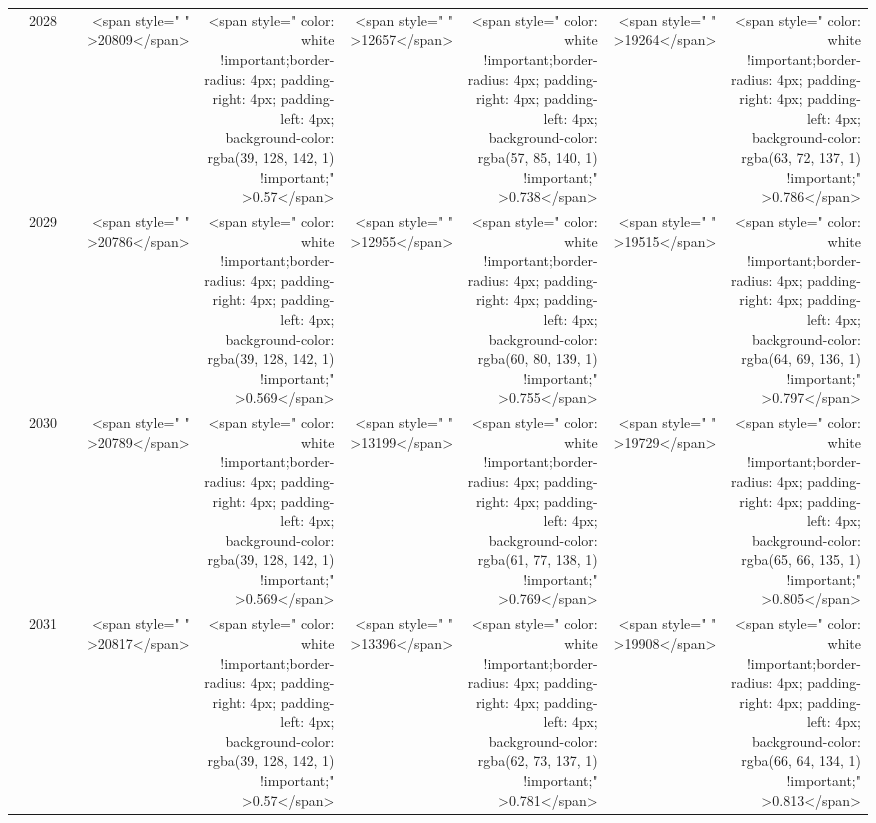 \begin{table}
\begin{tabular}[t]{>{}l|l>{}rr>{}r|rrrr}
 & 2028 & \cellcolor[HTML]{B0A473}{\textcolor{white}{1200}} & <span style="     " >20809</span> & <span style="     color: white !important;border-radius: 4px; padding-right: 4px; padding-left: 4px; background-color: rgba(39, 128, 142, 1) !important;" >0.57</span> & <span style="     " >12657</span> & <span style="     color: white !important;border-radius: 4px; padding-right: 4px; padding-left: 4px; background-color: rgba(57, 85, 140, 1) !important;" >0.738</span> & <span style="     " >19264</span> & <span style="     color: white !important;border-radius: 4px; padding-right: 4px; padding-left: 4px; background-color: rgba(63, 72, 137, 1) !important;" >0.786</span>\\

 & 2029 & \cellcolor[HTML]{B0A473}{\textcolor{white}{1200}} & <span style="     " >20786</span> & <span style="     color: white !important;border-radius: 4px; padding-right: 4px; padding-left: 4px; background-color: rgba(39, 128, 142, 1) !important;" >0.569</span> & <span style="     " >12955</span> & <span style="     color: white !important;border-radius: 4px; padding-right: 4px; padding-left: 4px; background-color: rgba(60, 80, 139, 1) !important;" >0.755</span> & <span style="     " >19515</span> & <span style="     color: white !important;border-radius: 4px; padding-right: 4px; padding-left: 4px; background-color: rgba(64, 69, 136, 1) !important;" >0.797</span>\\

 & 2030 & \cellcolor[HTML]{B0A473}{\textcolor{white}{1200}} & <span style="     " >20789</span> & <span style="     color: white !important;border-radius: 4px; padding-right: 4px; padding-left: 4px; background-color: rgba(39, 128, 142, 1) !important;" >0.569</span> & <span style="     " >13199</span> & <span style="     color: white !important;border-radius: 4px; padding-right: 4px; padding-left: 4px; background-color: rgba(61, 77, 138, 1) !important;" >0.769</span> & <span style="     " >19729</span> & <span style="     color: white !important;border-radius: 4px; padding-right: 4px; padding-left: 4px; background-color: rgba(65, 66, 135, 1) !important;" >0.805</span>\\

 & 2031 & \cellcolor[HTML]{B0A473}{\textcolor{white}{1200}} & <span style="     " >20817</span> & <span style="     color: white !important;border-radius: 4px; padding-right: 4px; padding-left: 4px; background-color: rgba(39, 128, 142, 1) !important;" >0.57</span> & <span style="     " >13396</span> & <span style="     color: white !important;border-radius: 4px; padding-right: 4px; padding-left: 4px; background-color: rgba(62, 73, 137, 1) !important;" >0.781</span> & <span style="     " >19908</span> & <span style="     color: white !important;border-radius: 4px; padding-right: 4px; padding-left: 4px; background-color: rgba(66, 64, 134, 1) !important;" >0.813</span>\\


\end{tabular}
\end{table}
